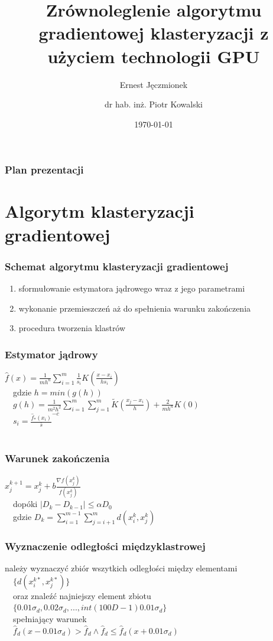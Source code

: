 \documentclass{beamer}
\title{Zrównoleglenie algorytmu gradientowej klasteryzacji z użyciem technologii GPU}
\subtitle{Ernest Jęczmionek}
\author{dr hab. inż. Piotr Kowalski}
\institute{Wydział Fizyki i Informatyki Stosowanej}
\date{\today}
\begin{document}
\titleframe[pl]

\begin{frame}\frametitle{Plan prezentacji} %
	\tableofcontents
\end{frame}

\section{Algorytm klasteryzacji gradientowej}
\begin{frame}\frametitle{Schemat algorytmu klasteryzacji gradientowej}
\begin{enumerate}
	\item sformułowanie estymatora jądrowego wraz z jego parametrami
	\item wykonanie przemieszczeń aż do spełnienia warunku zakończenia
	\item procedura tworzenia klastrów
\end{enumerate}
\end{frame}

\begin{frame}\frametitle{Estymator jądrowy}
\begin{center}
$\hat{f}(x)=\frac{1}{mh^n} \displaystyle \sum_{i=1}^{m} \frac{1}{s_i}K(\frac{x-x_i}{hs_i})$ \\~\
gdzie $h = min(g(h))$ \\~\
$g(h)=\frac{1}{m^2h^2}\displaystyle\sum_{i=1}^{m} \displaystyle\sum_{j=1}^{m} \widetilde{K}(\frac{x_j - x_i}{h}) + \frac{2}{mh^n}K(0)$ \\~\
$s_i = {\frac{\hat{f}_*(x_i)}{\bar{s}}}^{-c}$ \\~\
\end{center}
\end{frame}

\begin{frame}\frametitle{Warunek zakończenia}
\begin{center}
$x_j^{k+1} = x_j^k + b\frac{\nabla f(x_j^k)}{f(x_j^k)}$ \\~\
dopóki $|D_k - D_{k-1}| \leq \alpha D_0$ \\~\
gdzie $D_k = \displaystyle\sum_{i=1}^{m-1} \displaystyle\sum_{j=i+1}^{m} d(x_i^k, x_j^k)$
\end{center}
\end{frame}

\begin{frame}\frametitle{Wyznaczenie odległości międzyklastrowej}
\begin{center}
należy wyznaczyć zbiór wszytkich odległości między elementami \\~\
$\{d(x^{k*}_i, x^{k*}_j)\}$ \\~\
oraz znaleźć najniejszy element zbiotu \\~\
$\{0.01 \sigma_d, 0.02 \sigma_d, ... , int(100D-1) 0.01 \sigma_d \}$ \\~\
spełniający warunek \\~\
$\hat{f}_d(x-0.01\sigma_d) > \hat{f}_d \wedge \hat{f}_d \leq \hat{f}_d(x+0.01\sigma_d)$
\end{center}
\end{frame}
\end{document}
